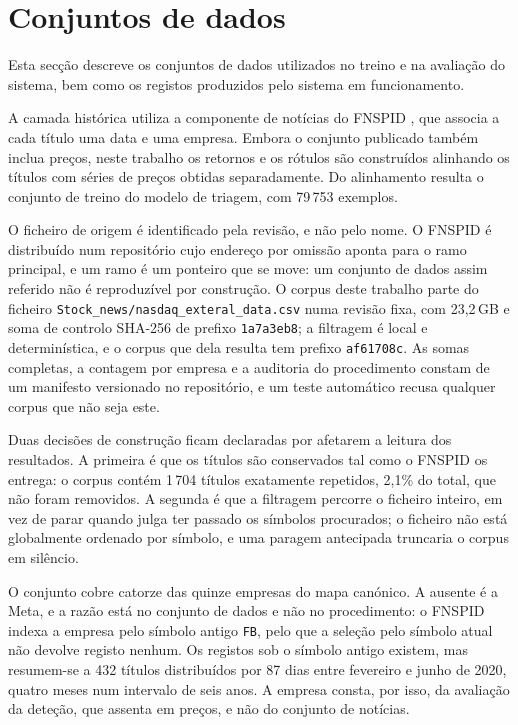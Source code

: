 \section{Conjuntos de dados}
\label{sec:met_dados}

Esta secção descreve os conjuntos de dados utilizados no treino e na avaliação do sistema, bem
como os registos produzidos pelo sistema em funcionamento.

A camada histórica utiliza a componente de notícias do \gls{FNSPID} \autocite{dong2024fnspid}, que
associa a cada título uma data e uma empresa. Embora o conjunto publicado também inclua preços,
neste trabalho os retornos e os rótulos são construídos alinhando os títulos com séries de preços
obtidas separadamente. Do alinhamento resulta o conjunto de treino do modelo de triagem, com
79\,753 exemplos.

O ficheiro de origem é identificado pela revisão, e não pelo nome. O \gls{FNSPID} é distribuído
num repositório cujo endereço por omissão aponta para o ramo principal, e um ramo é um ponteiro que
se move: um conjunto de dados assim referido não é reproduzível por construção. O corpus deste
trabalho parte do ficheiro \texttt{Stock\_news/nasdaq\_exteral\_data.csv} numa revisão fixa, com
23,2\,GB e soma de controlo SHA-256 de prefixo \texttt{1a7a3eb8}; a filtragem é local e
determinística, e o corpus que dela resulta tem prefixo \texttt{af61708c}. As somas completas, a
contagem por empresa e a auditoria do procedimento constam de um manifesto versionado no
repositório, e um teste automático recusa qualquer corpus que não seja este.

Duas decisões de construção ficam declaradas por afetarem a leitura dos resultados. A primeira é
que os títulos são conservados tal como o \gls{FNSPID} os entrega: o corpus contém 1\,704 títulos
exatamente repetidos, 2,1\% do total, que não foram removidos. A segunda é que a filtragem percorre
o ficheiro inteiro, em vez de parar quando julga ter passado os símbolos procurados; o ficheiro não
está globalmente ordenado por símbolo, e uma paragem antecipada truncaria o corpus em silêncio.

O conjunto cobre catorze das quinze empresas do mapa canónico. A ausente é a Meta, e a razão está
no conjunto de dados e não no procedimento: o \gls{FNSPID} indexa a empresa pelo símbolo antigo
\texttt{FB}, pelo que a seleção pelo símbolo atual não devolve registo nenhum. Os registos sob o
símbolo antigo existem, mas resumem-se a 432 títulos distribuídos por 87 dias entre fevereiro e
junho de 2020, quatro meses num intervalo de seis anos. A empresa consta, por isso, da avaliação
da deteção, que assenta em preços, e não do conjunto de notícias.

